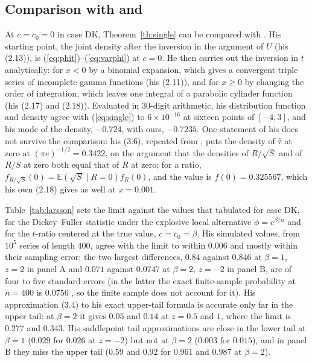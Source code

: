 \documentclass[ecta,nameyear,final]{econsocart}
\newcommand{\E}{{\mathbb E}}
\newcommand{\Fk}{\textsf{\upshape DK}}
\theoremstyle{plain}
\theoremstyle{definition}
\begin{document}
\subsection{Comparison with \cite{Abadir1995} and \cite{Larsson1995}}
\label{sec:larsson}

At $c=c_0=0$ in case \Fk, Theorem~\ref{th:single} can be compared with \cite{Abadir1995}.  His starting point, the joint density after the inversion in the argument of $U$ (his (2.13)), is (\ref{eq:phit})--(\ref{eq:varphi}) at $c=0$.  He then carries out the inversion in $t$ analytically: for $x<0$ by a binomial expansion, which gives a convergent triple series of incomplete gamma functions (his (2.11)), and for $x\ge0$ by changing the order of integration, which leaves one integral of a parabolic cylinder function (his (2.17) and (2.18)).  Evaluated in 30-digit arithmetic, his distribution function and density agree with (\ref{eq:single}) to $6\times10^{-16}$ at sixteen points of $[-4,3]$, and his mode of the density, $-0.724$, with ours, $-0.7235$.  One statement of his does not survive the comparison: his (3.6), repeated from \citet[p.~316]{Abadir1992}, puts the density of $\hat\tau$ at zero at $(\pi e)^{-1/2}=0.3422$, on the argument that the densities of $R/\sqrt S$ and of $R/S$ at zero both equal that of $R$ at zero; for a ratio, $f_{R/\sqrt S}(0)=\E(\sqrt S\mid R=0)f_R(0)$, and the value is $f(0)=0.325567$, which his own (2.18) gives as well at $x=0.001$.

Table~\ref{tab:larsson} sets the limit against the values that \cite{Larsson1995} tabulated for case \Fk, for the Dickey--Fuller statistic under the explosive local alternative $\phi=e^{\beta/n}$ and for the $t$-ratio centered at the true value, $c=c_0=\beta$.  His simulated values, from $10^5$ series of length $400$, agree with the limit to within $0.006$ and mostly within their sampling error; the two largest differences, $0.84$ against $0.846$ at $\beta=1$, $z=2$ in panel A and $0.071$ against $0.0747$ at $\beta=2$, $z=-2$ in panel B, are of four to five standard errors (in the latter the exact finite-sample probability at $n=400$ is $0.0756$ \citep{BaoBrodaKan2026}, so the finite sample does not account for it).  His approximation (3.4) to his exact upper-tail formula is accurate only far in the upper tail: at $\beta=2$ it gives $0.05$ and $0.14$ at $z=0.5$ and $1$, where the limit is $0.277$ and $0.343$.  His saddlepoint tail approximations are close in the lower tail at $\beta=1$ ($0.029$ for $0.026$ at $z=-2$) but not at $\beta=2$ ($0.003$ for $0.015$), and in panel B they miss the upper tail ($0.59$ and $0.92$ for $0.961$ and $0.987$ at $\beta=2$).
\end{document}
